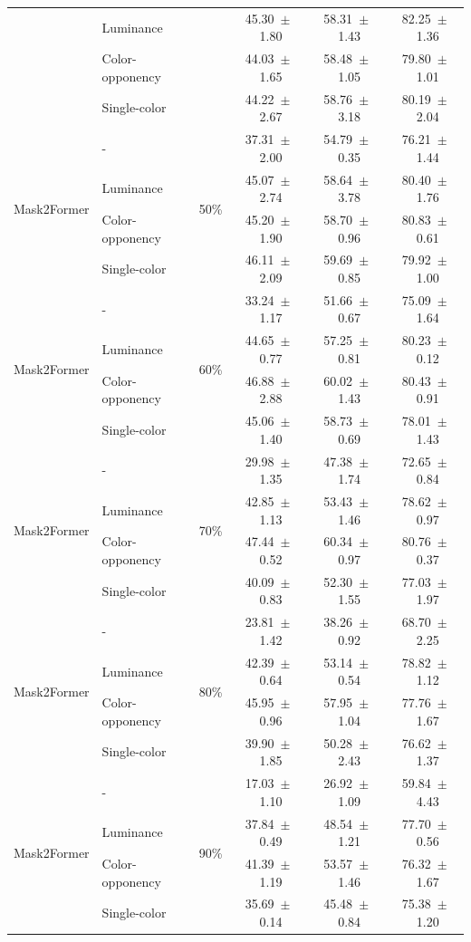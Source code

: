 \begin{table}[h]
\begin{tabular}{@{}l l c c c c@{}}
    & Luminance &  & 45.30~$\pm$~1.80 & 58.31~$\pm$~1.43 & 82.25~$\pm$~1.36 \\
    & Color-opponency &  & 44.03~$\pm$~1.65 & 58.48~$\pm$~1.05 & 79.80~$\pm$~1.01 \\
    & Single-color &  & 44.22~$\pm$~2.67 & 58.76~$\pm$~3.18 & 80.19~$\pm$~2.04 \\
    \midrule
    \multirow{4}{*}{Mask2Former} & - & \multirow{4}{*}{50\%} & 37.31~$\pm$~2.00 & 54.79~$\pm$~0.35 & 76.21~$\pm$~1.44 \\
    & Luminance &  & 45.07~$\pm$~2.74 & 58.64~$\pm$~3.78 & 80.40~$\pm$~1.76 \\
    & Color-opponency &  & 45.20~$\pm$~1.90 & 58.70~$\pm$~0.96 & 80.83~$\pm$~0.61 \\
    & Single-color &  & 46.11~$\pm$~2.09 & 59.69~$\pm$~0.85 & 79.92~$\pm$~1.00 \\
    \midrule
    \multirow{4}{*}{Mask2Former} & - & \multirow{4}{*}{60\%} & 33.24~$\pm$~1.17 & 51.66~$\pm$~0.67 & 75.09~$\pm$~1.64 \\
    & Luminance &  & 44.65~$\pm$~0.77 & 57.25~$\pm$~0.81 & 80.23~$\pm$~0.12 \\
    & Color-opponency &  & 46.88~$\pm$~2.88 & 60.02~$\pm$~1.43 & 80.43~$\pm$~0.91 \\
    & Single-color &  & 45.06~$\pm$~1.40 & 58.73~$\pm$~0.69 & 78.01~$\pm$~1.43 \\
    \midrule
    \multirow{4}{*}{Mask2Former} & - & \multirow{4}{*}{70\%} & 29.98~$\pm$~1.35 & 47.38~$\pm$~1.74 & 72.65~$\pm$~0.84 \\
    & Luminance &  & 42.85~$\pm$~1.13 & 53.43~$\pm$~1.46 & 78.62~$\pm$~0.97 \\
    & Color-opponency &  & 47.44~$\pm$~0.52 & 60.34~$\pm$~0.97 & 80.76~$\pm$~0.37 \\
    & Single-color &  & 40.09~$\pm$~0.83 & 52.30~$\pm$~1.55 & 77.03~$\pm$~1.97 \\
    \midrule
    \multirow{4}{*}{Mask2Former} & - & \multirow{4}{*}{80\%} & 23.81~$\pm$~1.42 & 38.26~$\pm$~0.92 & 68.70~$\pm$~2.25 \\
    & Luminance &  & 42.39~$\pm$~0.64 & 53.14~$\pm$~0.54 & 78.82~$\pm$~1.12 \\
    & Color-opponency &  & 45.95~$\pm$~0.96 & 57.95~$\pm$~1.04 & 77.76~$\pm$~1.67 \\
    & Single-color &  & 39.90~$\pm$~1.85 & 50.28~$\pm$~2.43 & 76.62~$\pm$~1.37 \\
    \midrule
    \multirow{4}{*}{Mask2Former} & - & \multirow{4}{*}{90\%} & 17.03~$\pm$~1.10 & 26.92~$\pm$~1.09 & 59.84~$\pm$~4.43 \\
    & Luminance &  & 37.84~$\pm$~0.49 & 48.54~$\pm$~1.21 & 77.70~$\pm$~0.56 \\
    & Color-opponency &  & 41.39~$\pm$~1.19 & 53.57~$\pm$~1.46 & 76.32~$\pm$~1.67 \\
    & Single-color &  & 35.69~$\pm$~0.14 & 45.48~$\pm$~0.84 & 75.38~$\pm$~1.20 \\
    \midrule
    \bottomrule
  \end{tabular}
  \label{tab:mask2former_acdc_full}
\end{table}